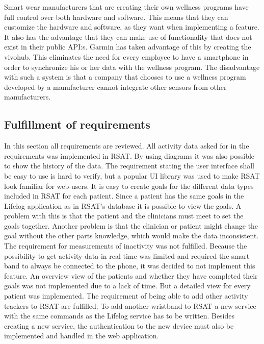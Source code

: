 \documentclass{cslthse-msc}
\begin{document}
Smart wear manufacturers that are creating their own wellness programs have full control over both hardware and software. This means that they can customize the hardware and software, as they want when implementing a feature. It also has the advantage that they can make use of functionality that does not exist in their public API:s. Garmin has taken advantage of this by creating the vivohub. This eliminates the need for every employee to have a smartphone in order to synchronize his or her data with the wellness program. The disadvantage with such a system is that a company that chooses to use a wellness program developed by a manufacturer cannot integrate other sensors from other manufacturers. 

\subsection{Fulfillment of requirements}

In this section all requirements are reviewed. All activity data asked for in the requirements was implemented in RSAT. By using diagrams it was also possible to show the history of the data. The requirement stating the user interface shall be easy to use is hard to verify, but a popular UI library was used to make RSAT look familiar for web-users. It is easy to create goals for the different data types included in RSAT for each patient. Since a patient has the same goals in the Lifelog application as in RSAT’s database it is possible to view the goals. A problem with this is that the patient and the clinicians must meet to set the goals together. Another problem is that the clinician or patient might change the goal without the other parts knowledge, which would make the data inconsistent. The requirement for measurements of inactivity was not fulfilled. Because the possibility to get activity data in real time was limited and required the smart band to always be connected to the phone, it was decided to not implement this feature. An overview view of the patients and whether they have completed their goals was not implemented due to a lack of time. But a detailed view for every patient was implemented. The requirement of being able to add other activity trackers to RSAT are fulfilled. To add another wristband to RSAT a new service with the same commands as the Lifelog service has to be written. Besides creating a new service, the authentication to the new device must also be implemented and handled in the web application.


\end{document}

